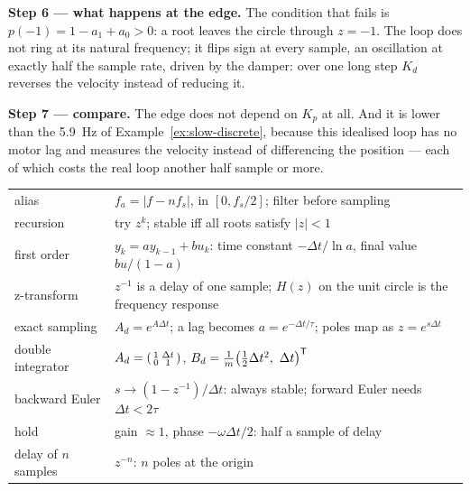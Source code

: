 \begin{example}
\textbf{Step 6 — what happens at the edge.} The condition that fails is $p(-1) = 1 - a_1 + a_0 > 0$: a root leaves the circle through $z = -1$. The loop does not ring at its natural frequency; it flips sign at every sample, an oscillation at exactly half the sample rate, driven by the damper: over one long step $K_d$ reverses the velocity instead of reducing it.

\textbf{Step 7 — compare.} The edge does not depend on $K_p$ at all. And it is lower than the \SI{5.9}{Hz} of Example~\ref{ex:slow-discrete}, because this idealised loop has no motor lag and measures the velocity instead of differencing the position — each of which costs the real loop another half sample or more.
\end{example}

\begin{result}
\begin{center}\small
\renewcommand{\arraystretch}{1.4}
\begin{tabularx}{\linewidth}{@{}l>{\raggedright\arraybackslash}X@{}}
alias & $f_a = |f - nf_s|$, in $[0, f_s/2]$; filter before sampling\\
recursion & try $z^k$; stable iff all roots satisfy $|z| < 1$\\
first order & $y_k = ay_{k-1} + bu_k$: time constant $-\Delta t/\ln a$, final value $bu/(1 - a)$\\
z-transform & $z^{-1}$ is a delay of one sample; $H(z)$ on the unit circle is the frequency response\\
exact sampling & $A_d = e^{A\Delta t}$; a lag becomes $a = e^{-\Delta t/\tau}$; poles map as $z = e^{s\Delta t}$\\
double integrator & $A_d = \begin{psmallmatrix}1 & \Delta t\\ 0 & 1\end{psmallmatrix}$, $B_d = \tfrac1m\big(\tfrac12\Delta t^2,\ \Delta t\big)^{\mathsf{T}}$\\
backward Euler & $s \to (1 - z^{-1})/\Delta t$: always stable; forward Euler needs $\Delta t < 2\tau$\\
hold & gain $\approx 1$, phase $-\omega\Delta t/2$: half a sample of delay\\
delay of $n$ samples & $z^{-n}$: $n$ poles at the origin\\
\end{tabularx}
\end{center}
\end{result}
